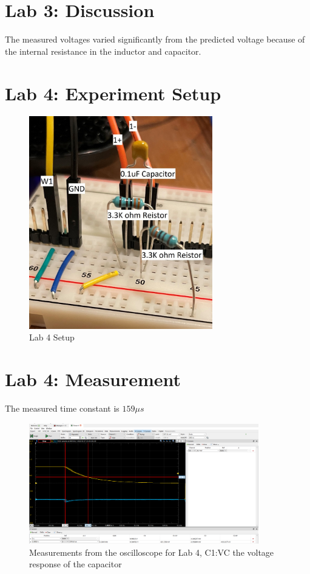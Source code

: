 \documentclass[12pt]{article}
\begin{document}
\section*{Lab 3: Discussion}
The measured voltages varied significantly from the predicted voltage because of the internal resistance in the inductor and capacitor.
\pagebreak
\section*{Lab 4: Experiment Setup}
\begin{figure}[h]
\includegraphics[width=8cm]{Lab4}
\centering
\caption{Lab 4 Setup}
\end{figure}
\section*{Lab 4: Measurement}
The measured time constant is $159\mu s$
\begin{figure}[h]
\includegraphics[width=10cm]{Problem 4}
\centering
\caption{Measurements from the oscilloscope for Lab 4, C1:VC the voltage response of the capacitor}
\end{figure}
\pagebreak
\end{document}
